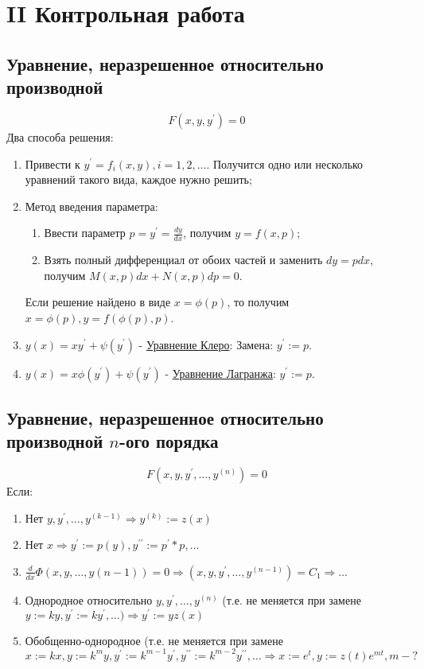 \documentclass[a5paper,10pt]{article}
\begin{document}
		\newpage

	\section{II Контрольная работа}
		\subsection{Уравнение, неразрешенное относительно производной}
			$$ F(x,y,y^{\prime}) = 0 $$
			Два способа решения:
			\begin{enumerate}
				\item Привести к $ y^{\prime} = f_i(x,y), i=1,2,\ldots $. Получится одно или несколько уравнений такого вида, каждое нужно решить;
				
				\item Метод введения параметра:
					\begin{enumerate}
						\item Ввести параметр $ p = y^{\prime} = \frac{dy}{dx} $, получим $ y = f(x,p) $;
						\item Взять полный дифференциал от обоих частей и заменить $ dy = pdx $, получим $ M(x,p)dx+N(x,p)dp=0 $.
					\end{enumerate}
				Если решение найдено в виде $ x=\phi(p) $, то получим $ x=\phi(p), y=f(\phi(p),p) $.
				\item $ y(x) = xy^{\prime}+\psi(y^{\prime}) $ - \underline{Уравнение Клеро}: Замена: $ y^{\prime}:=p $.
				\item $ y(x) = x\phi(y^{\prime})+\psi(y^{\prime}) $ - \underline{Уравнение Лагранжа}: $ y^{\prime}:=p $.
			\end{enumerate}

		\subsection{Уравнение, неразрешенное относительно производной $n$-ого порядка}
			$$ F(x,y,y^{\prime},\ldots,y^{(n)}) = 0 $$
			Если:
			\begin{enumerate}
				\item Нет $ y,y^{\prime},\ldots,y^{(k-1)} \Rightarrow y^{(k)} := z(x) $
				
				\item Нет $ x \Rightarrow y^{\prime}:=p(y), y^{\prime\prime}:=p^{\prime}*p, \ldots $
				
				\item $ \frac{d}{dx}\Phi(x, y, \ldots, y(n-1))=0 \Rightarrow (x, y, y^{\prime}, \ldots, y^{(n-1)}) = C_1 \Rightarrow \ldots $
				
				\item Однородное относительно $ y,y^{\prime},\ldots,y^{(n)} $ (т.е. не меняется при замене $ y := ky, y^{\prime}:=ky^{\prime}, \ldots) \Rightarrow y^{\prime}:=yz(x) $
				
				\item Обобщенно-однородное (т.е. не меняется при замене $ x:=kx, y:=k^m y, y^{\prime}:=k^{m-1}y^{\prime}, y^{\prime\prime}:=k^{m-2}y^{\prime\prime}, \ldots\Rightarrow x:=e^t, y:=z(t)e^{mt}, m - ? $
			\end{enumerate}
\end{document}
